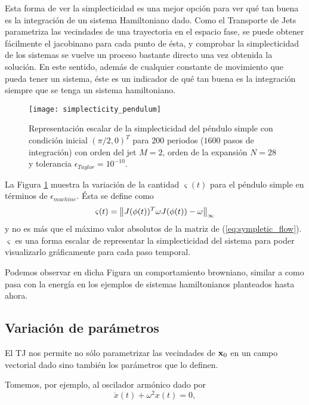 Esta forma de ver la simplecticidad es una mejor opción para ver qué tan buena es la integración de un sistema Hamiltoniano dado. Como el Transporte de Jets parametriza las vecindades de una trayectoria en el espacio fase, se puede obtener fácilmente el jacobinano para cada punto de ésta, y comprobar la simplecticidad de los sistemas se vuelve un proceso bastante directo una vez obtenida la solución. En este sentido, además de cualquier constante de movimiento que pueda tener un sistema, éste es un indicador de qué tan buena es la integración siempre que se tenga un sistema hamiltoniano.

\begin{figure}[h!]
 \centering
 \texttt{[image: simplecticity\_pendulum]}
 \caption{Representación escalar de la simplecticidad del péndulo simple con condición inicial $( \pi/2,0)^T$ para $200$ periodos ($1600 $ pasos de integración) con orden del jet $M=2$, orden de la expansión $N = 28$ y tolerancia $\epsilon_{Taylor} = 10^{-10}$.}
 \label{fig:simplecticity_pendulum}
\end{figure}

La Figura \ref{fig:simplecticity_pendulum} muestra la variación de la cantidad $\varsigma(t)$ para el péndulo simple en términos de $\epsilon_{machine}$. Ésta se define como
\begin{equation}
 \varsigma(t) = \left\lVert J(\phi(t))^T \omega J(\phi(t)) - \omega \right\rVert_\infty
 \label{eq:scalar_symplecticity}
\end{equation}
y no es más que el máximo valor absolutos de la matriz de (\ref{eq:sympletic_flow}). $\varsigma$ es una forma escalar de representar la simplecticidad del sistema para poder visualizarlo gráficamente para cada paso temporal.
  
Podemos observar en dicha Figura un comportamiento browniano, similar a como pasa con la energía en los ejemplos de sistemas hamiltonianos planteados hasta ahora.


\subsection{Variación de parámetros}
\label{sec:parameter_variation}
El TJ nos permite no sólo parametrizar las vecindades de $\mathbf{x}_0$ en un campo vectorial dado sino también los parámetros que lo definen.

Tomemos, por ejemplo, al oscilador armónico dado por  
\begin{equation}
 \ddot{x}(t) + \omega^2 x(t) = 0,
 \label{eq:one_dim_oscil}
\end{equation}

